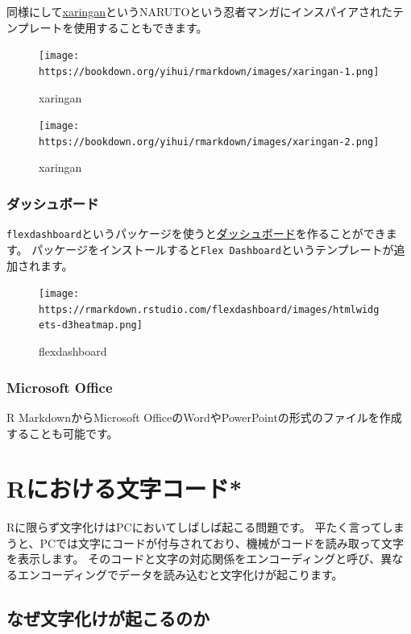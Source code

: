 \documentclass[]{bxjsreport}
\let\asdf\section
\renewcommand{\section}{\chapter}
\let\asdff\subsection
\renewcommand{\subsection}{\asdf}
\renewcommand{\subsubsection}{\asdff}
\begin{document}
同様にして\href{https://github.com/yihui/xaringan}{xaringan}というNARUTOという忍者マンガにインスパイアされたテンプレートを使用することもできます。

\begin{figure}
\centering
\texttt{[image: https://bookdown.org/yihui/rmarkdown/images/xaringan-1.png]}
\caption{xaringan}
\end{figure}

\begin{figure}
\centering
\texttt{[image: https://bookdown.org/yihui/rmarkdown/images/xaringan-2.png]}
\caption{xaringan}
\end{figure}

\hypertarget{Dashboard}{%
\subsubsection{ダッシュボード}\label{Dashboard}}

\texttt{flexdashboard}というパッケージを使うと\href{https://rmarkdown.rstudio.com/flexdashboard/}{ダッシュボード}を作ることができます。
パッケージをインストールすると\texttt{Flex\ Dashboard}というテンプレートが追加されます。

\begin{figure}
\centering
\texttt{[image: https://rmarkdown.rstudio.com/flexdashboard/images/htmlwidgets-d3heatmap.png]}
\caption{flexdashboard}
\end{figure}

\hypertarget{microsoft-office}{%
\subsubsection{Microsoft Office}\label{microsoft-office}}

R MarkdownからMicrosoft OfficeのWordやPowerPointの形式のファイルを作成することも可能です。

\hypertarget{encoding-r}{%
\section{Rにおける文字コード*}\label{encoding-r}}

Rに限らず文字化けはPCにおいてしばしば起こる問題です。
平たく言ってしまうと、PCでは文字にコードが付与されており、機械がコードを読み取って文字を表示します。
そのコードと文字の対応関係をエンコーディングと呼び、異なるエンコーディングでデータを読み込むと文字化けが起こります。

\hypertarget{ux306aux305cux6587ux5b57ux5316ux3051ux304cux8d77ux3053ux308bux306eux304b}{%
\subsection{なぜ文字化けが起こるのか}\label{ux306aux305cux6587ux5b57ux5316ux3051ux304cux8d77ux3053ux308bux306eux304b}}
\end{document}
